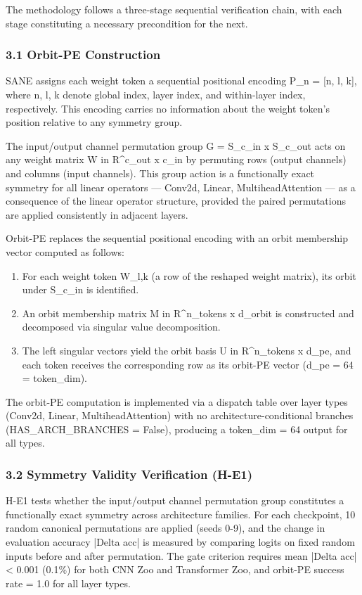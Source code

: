 
The methodology follows a three-stage sequential verification chain, with each stage constituting a necessary precondition for the next.

\subsubsection{3.1 Orbit-PE Construction}

SANE \citep{Schurholtetal2024} assigns each weight token a sequential positional encoding P_n = [n, l, k], where n, l, k denote global index, layer index, and within-layer index, respectively. This encoding carries no information about the weight token's position relative to any symmetry group.

The input/output channel permutation group G = S_{c_in} x S_{c_out} acts on any weight matrix W in R^{c_out x c_in} by permuting rows (output channels) and columns (input channels). This group action is a functionally exact symmetry for all linear operators — Conv2d, Linear, MultiheadAttention — as a consequence of the linear operator structure, provided the paired permutations are applied consistently in adjacent layers.

Orbit-PE replaces the sequential positional encoding with an orbit membership vector computed as follows:

\begin{enumerate}
\item For each weight token W_{l,k} (a row of the reshaped weight matrix), its orbit under S_{c_in} is identified.
\item An orbit membership matrix M in R^{n_tokens x d_orbit} is constructed and decomposed via singular value decomposition.
\item The left singular vectors yield the orbit basis U in R^{n_tokens x d_pe}, and each token receives the corresponding row as its orbit-PE vector (d_pe = 64 = token_dim).
\end{enumerate}

The orbit-PE computation is implemented via a dispatch table over layer types (Conv2d, Linear, MultiheadAttention) with no architecture-conditional branches (HAS_ARCH_BRANCHES = False), producing a token_dim = 64 output for all types.

\subsubsection{3.2 Symmetry Validity Verification (H-E1)}

H-E1 tests whether the input/output channel permutation group constitutes a functionally exact symmetry across architecture families. For each checkpoint, 10 random canonical permutations are applied (seeds 0-9), and the change in evaluation accuracy |Delta acc| is measured by comparing logits on fixed random inputs before and after permutation. The gate criterion requires mean |Delta acc| < 0.001 (0.1\%) for both CNN Zoo and Transformer Zoo, and orbit-PE success rate = 1.0 for all layer types.

